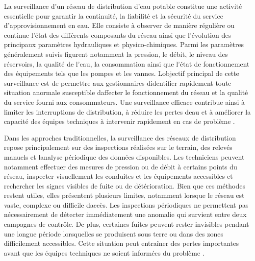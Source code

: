 \documentclass[12pt,a4paper,oneside]{report}
\begin{document}
La surveillance d'un réseau de distribution d'eau potable constitue une
activité essentielle pour garantir la continuité, la fiabilité et la
sécurité du service d'approvisionnement en eau. Elle consiste à observer
de manière régulière ou continue l'état des différents composants du
réseau ainsi que l'évolution des principaux paramètres hydrauliques et
physico-chimiques. Parmi les paramètres généralement suivis figurent
notamment la pression, le débit, le niveau des réservoirs, la qualité de
l'eau, la consommation ainsi que l'état de fonctionnement des
équipements tels que les pompes et les vannes.
L\textquotesingle objectif principal de cette surveillance est de
permettre aux gestionnaires d\textquotesingle identifier rapidement
toute situation anormale susceptible d\textquotesingle affecter le
fonctionnement du réseau et la qualité du service fourni aux
consommateurs. Une surveillance efficace contribue ainsi à limiter les
interruptions de distribution, à réduire les pertes
d\textquotesingle eau et à améliorer la capacité des équipes techniques
à intervenir rapidement en cas de problème \cite{ref11}.

Dans les approches traditionnelles, la surveillance des réseaux de
distribution repose principalement sur des inspections réalisées sur le
terrain, des relevés manuels et l\textquotesingle analyse périodique des
données disponibles. Les techniciens peuvent notamment effectuer des
mesures de pression ou de débit à certains points du réseau, inspecter
visuellement les conduites et les équipements accessibles et rechercher
les signes visibles de fuite ou de détérioration. Bien que ces méthodes
restent utiles, elles présentent plusieurs limites, notamment lorsque le
réseau est vaste, complexe ou difficile d\textquotesingle accès. Les
inspections périodiques ne permettent pas nécessairement de détecter
immédiatement une anomalie qui survient entre deux campagnes de
contrôle. De plus, certaines fuites peuvent rester invisibles pendant
une longue période lorsqu\textquotesingle elles se produisent sous terre
ou dans des zones difficilement accessibles. Cette situation peut
entraîner des pertes importantes avant que les équipes techniques ne
soient informées du problème \cite{ref45}.
\end{document}
